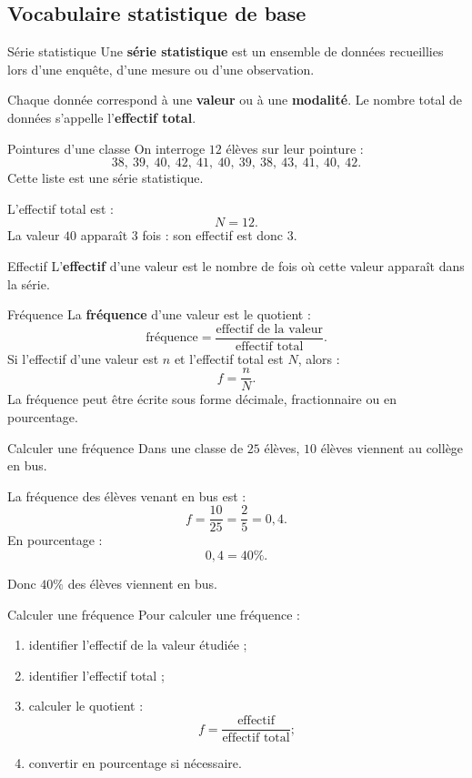 \documentclass[11pt,a4paper]{article}
\begin{document}
\subsection{Vocabulaire statistique de base}

\begin{definitionbox}{Série statistique}
Une \textbf{série statistique} est un ensemble de données recueillies lors d'une enquête, d'une mesure ou d'une observation.

Chaque donnée correspond à une \textbf{valeur} ou à une \textbf{modalité}. Le nombre total de données s'appelle l'\textbf{effectif total}.
\end{definitionbox}

\begin{examplebox}{Pointures d'une classe}
On interroge $12$ élèves sur leur pointure :
\[
38,\ 39,\ 40,\ 42,\ 41,\ 40,\ 39,\ 38,\ 43,\ 41,\ 40,\ 42.
\]
Cette liste est une série statistique.

L'effectif total est :
\[
N=12.
\]
La valeur $40$ apparaît $3$ fois : son effectif est donc $3$.
\end{examplebox}

\begin{definitionbox}{Effectif}
L'\textbf{effectif} d'une valeur est le nombre de fois où cette valeur apparaît dans la série.
\end{definitionbox}

\begin{definitionbox}{Fréquence}
La \textbf{fréquence} d'une valeur est le quotient :
\[
\text{fréquence}=\frac{\text{effectif de la valeur}}{\text{effectif total}}.
\]
Si l'effectif d'une valeur est $n$ et l'effectif total est $N$, alors :
\[
f=\frac{n}{N}.
\]
La fréquence peut être écrite sous forme décimale, fractionnaire ou en pourcentage.
\end{definitionbox}

\begin{examplebox}{Calculer une fréquence}
Dans une classe de $25$ élèves, $10$ élèves viennent au collège en bus.

La fréquence des élèves venant en bus est :
\[
f=\frac{10}{25}=\frac{2}{5}=0{,}4.
\]
En pourcentage :
\[
0{,}4=40\%.
\]

Donc $40\%$ des élèves viennent en bus.
\end{examplebox}

\begin{methodbox}{Calculer une fréquence}
Pour calculer une fréquence :
\begin{enumerate}
    \item identifier l'effectif de la valeur étudiée ;
    \item identifier l'effectif total ;
    \item calculer le quotient :
    \[
    f=\frac{\text{effectif}}{\text{effectif total}} ;
    \]
    \item convertir en pourcentage si nécessaire.
\end{enumerate}
\end{methodbox}
\end{document}
